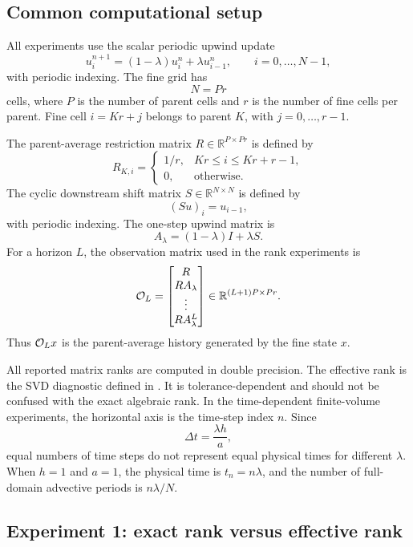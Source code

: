 \documentclass[pdflatex,sn-mathphys-num]{sn-jnl}%
\theoremstyle{thmstyleone}%
\theoremstyle{thmstyletwo}%
\theoremstyle{thmstylethree}%
\begin{document}
\subsection{Common computational setup}

All experiments use the scalar periodic upwind update
\[
  u_i^{n+1}
  =
  (1-\lambda)u_i^n+\lambda u_{i-1}^n,
  \qquad i=0,\ldots,N-1,
\]
with periodic indexing.  The fine grid has
\[
  N=Pr
\]
cells, where \(P\) is the number of parent cells and \(r\) is the number of
fine cells per parent.  Fine cell \(i=Kr+j\) belongs to parent \(K\), with
\(j=0,\ldots,r-1\).

The parent-average restriction matrix \(R\in\mathbb R^{P\times Pr}\) is
defined by
\[
  R_{K,i}
  =
  \begin{cases}
  1/r, & Kr\le i\le Kr+r-1,\\
  0, & \text{otherwise}.
  \end{cases}
\]
The cyclic downstream shift matrix \(S\in\mathbb R^{N\times N}\) is defined
by
\[
  (Su)_i=u_{i-1},
\]
with periodic indexing.  The one-step upwind matrix is
\[
  A_\lambda=(1-\lambda)I+\lambda S.
\]
For a horizon \(L\), the observation matrix used in the rank experiments is
\[
  {\cal O}_L
  =
  \begin{bmatrix}
  R\\
  RA_\lambda\\
  \vdots\\
  RA_\lambda^L
  \end{bmatrix}
  \in
  \mathbb R^{(L+1)P\times Pr}.
\]
Thus \({\cal O}_Lx\) is the parent-average history generated by the fine
state \(x\).

All reported matrix ranks are computed in double precision.  The effective
rank is the SVD diagnostic defined in
.  It is tolerance-dependent and should not
be confused with the exact algebraic rank.  In the time-dependent
finite-volume experiments, the horizontal axis is the time-step index \(n\).
Since
\[
  \Delta t=\frac{\lambda h}{a},
\]
equal numbers of time steps do not represent equal physical times for
different \(\lambda\).  When \(h=1\) and \(a=1\), the physical time is
\(t_n=n\lambda\), and the number of full-domain advective periods is
\(n\lambda/N\).

\subsection{Experiment 1: exact rank versus effective rank}
\end{document}
